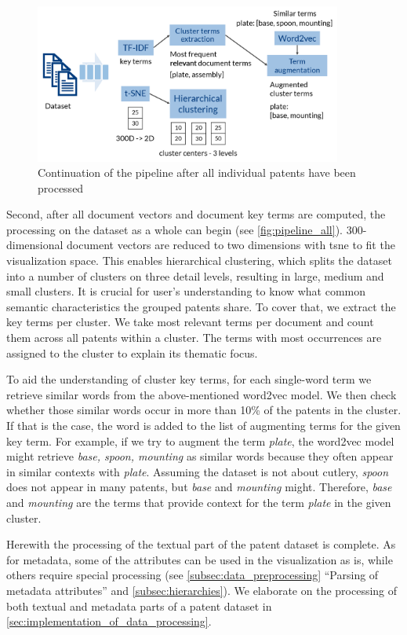 \begin{figure}[!]
\centering
\includegraphics[width=0.9\textwidth]{img/pipeline_all}
\caption{Continuation of the pipeline after all individual patents have been processed}
\label{fig:pipeline_all}
\end{figure}

Second, after all document vectors and document key terms are computed, the processing on the dataset as a whole can begin (see \autoref{fig:pipeline_all}).
300-dimensional document vectors are reduced to two dimensions with \gls{tsne} to fit the visualization space.
This enables hierarchical clustering, which splits the dataset into a number of clusters on three detail levels, resulting in large, medium and small clusters.
It is crucial for user's understanding to know what common semantic characteristics the grouped patents share.
To cover that, we extract the key terms per cluster.
We take most relevant terms per document and count them across all patents within a cluster. 
The terms with most occurrences are assigned to the cluster to explain its thematic focus.

To aid the understanding of cluster key terms, for each single-word term we retrieve similar words from the above-mentioned word2vec model.
We then check whether those similar words occur in more than 10\% of the patents in the cluster.
If that is the case, the word is added to the list of augmenting terms for the given key term.
For example, if we try to augment the term \textit{plate}, the word2vec model might retrieve \textit{base, spoon, mounting} as similar words because they often appear in similar contexts with \textit{plate}.
Assuming the dataset is not about cutlery, \textit{spoon} does not appear in many patents, but \textit{base} and \textit{mounting} might. 
Therefore, \textit{base} and \textit{mounting} are the terms that provide context for the term \textit{plate} in the given cluster.

Herewith the processing of the textual part of the patent dataset is complete.
As for metadata, some of the attributes can be used in the visualization as is, while others require special processing (see \autoref{subsec:data_preprocessing} ``Parsing of metadata attributes'' and \autoref{subsec:hierarchies}).
We elaborate on the processing of both textual and metadata parts of a patent dataset in \autoref{sec:implementation_of_data_processing}.

